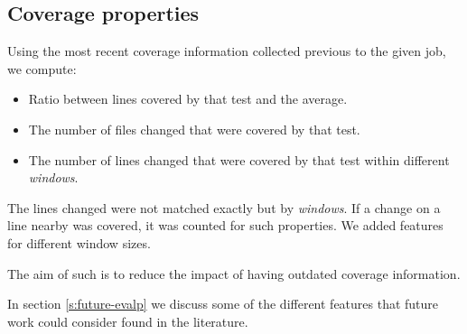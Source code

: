 \subsection{Coverage properties}

Using the most recent coverage information collected previous to
the given job, we compute:
\begin{itemize}
    \item Ratio between lines covered by that test and the average.
    \item The number of files changed that were covered by that test.
    \item The number of lines changed that were covered by that test within different \emph{windows}.
\end{itemize}

The lines changed were not matched exactly but by \emph{windows}. If a change on a
line nearby was covered, it was counted for such properties. We added features for
different window sizes.

The aim of such is to reduce the impact of having outdated coverage information.

In section \ref{s:future-evalp} we discuss some of the different features that 
future work could consider found in the literature.